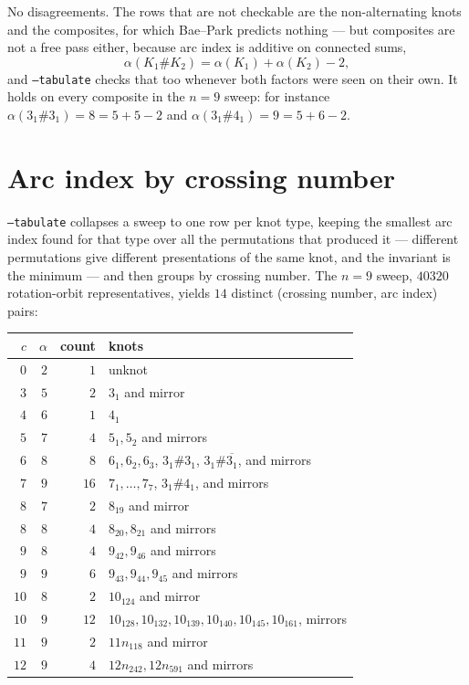 \documentclass[11pt,oneside]{report}
\theoremstyle{definition}
\begin{document}
\noindent
No disagreements. The rows that are not checkable are the non-alternating
knots and the composites, for which Bae--Park predicts nothing --- but
composites are not a free pass either, because arc index is additive on
connected sums,
\[
\alpha(K_1 \# K_2) = \alpha(K_1) + \alpha(K_2) - 2,
\]
and \texttt{--tabulate} checks that too whenever both factors were seen on
their own. It holds on every composite in the $n = 9$ sweep: for instance
$\alpha(3_1 \# 3_1) = 8 = 5 + 5 - 2$ and
$\alpha(3_1 \# 4_1) = 9 = 5 + 6 - 2$.

\section{Arc index by crossing number}\label{sec:arc-table}

\texttt{--tabulate} collapses a sweep to one row per knot type, keeping the
smallest arc index found for that type over all the permutations that
produced it --- different permutations give different presentations of the
same knot, and the invariant is the minimum --- and then groups by crossing
number. The $n = 9$ sweep, $40320$ rotation-orbit representatives, yields
$14$ distinct (crossing number, arc index) pairs:

\begin{center}
\begin{tabular}{@{}rrrl@{}}
\hline
$c$ & $\alpha$ & count & knots \\
\hline
$0$  & $2$ & $1$  & unknot \\
$3$  & $5$ & $2$  & $3_1$ and mirror \\
$4$  & $6$ & $1$  & $4_1$ \\
$5$  & $7$ & $4$  & $5_1, 5_2$ and mirrors \\
$6$  & $8$ & $8$  & $6_1, 6_2, 6_3$, $3_1 \# 3_1$, $3_1 \# \overline{3_1}$, and mirrors \\
$7$  & $9$ & $16$ & $7_1, \dots, 7_7$, $3_1 \# 4_1$, and mirrors \\
$8$  & $7$ & $2$  & $8_{19}$ and mirror \\
$8$  & $8$ & $4$  & $8_{20}, 8_{21}$ and mirrors \\
$9$  & $8$ & $4$  & $9_{42}, 9_{46}$ and mirrors \\
$9$  & $9$ & $6$  & $9_{43}, 9_{44}, 9_{45}$ and mirrors \\
$10$ & $8$ & $2$  & $10_{124}$ and mirror \\
$10$ & $9$ & $12$ & $10_{128}, 10_{132}, 10_{139}, 10_{140}, 10_{145}, 10_{161}$, mirrors \\
$11$ & $9$ & $2$  & $11n_{118}$ and mirror \\
$12$ & $9$ & $4$  & $12n_{242}, 12n_{591}$ and mirrors \\
\hline
\end{tabular}
\end{center}
\end{document}
